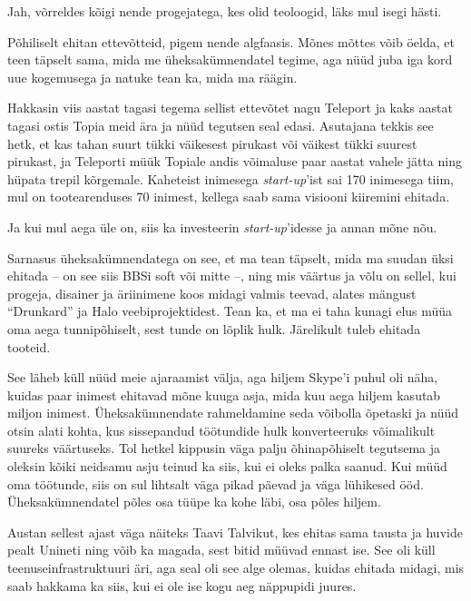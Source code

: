 
Jah, võrreldes kõigi nende progejatega, kes olid teoloogid, läks mul isegi 
hästi.


Põhiliselt ehitan ettevõtteid, pigem nende algfaasis. 
Mõnes mõttes võib öelda, et teen täpselt sama, mida me üheksakümnendatel 
tegime, aga nüüd juba iga kord uue kogemusega ja
natuke tean ka, mida ma räägin. 

Hakkasin viis 
aastat tagasi tegema sellist ettevõtet nagu Teleport ja kaks aastat tagasi ostis Topia
meid ära ja nüüd tegutsen seal edasi. Asutajana tekkis see hetk, et kas tahan suurt tükki 
väikesest pirukast või väikest tükki suurest pirukast, ja Teleporti müük 
Topiale andis võimaluse paar aastat vahele jätta ning hüpata trepil 
kõrgemale. Kaheteist inimesega \emph{start-up}'ist sai 170 inimesega tiim, mul on tootearenduses 70 
inimest, kellega saab sama visiooni kiiremini ehitada. 

Ja kui mul aega üle on, siis ka investeerin \emph{start-up}'idesse ja annan mõne
nõu. 

Sarnasus üheksakümnendatega on see, et ma tean täpselt, mida ma suudan üksi 
ehitada -- on see siis BBSi soft või mitte --, ning mis väärtus ja võlu 
on sellel, kui progeja, disainer ja äriinimene koos midagi valmis teevad, alates mängust \enquote{Drunkard} ja 
Halo veebiprojektidest. Tean ka, et ma ei taha kunagi elus müüa oma aega 
tunnipõhiselt, sest tunde on lõplik hulk. Järelikult tuleb ehitada tooteid. 

See läheb küll nüüd meie ajaraamist välja, aga hiljem 
Skype'i puhul oli näha, kuidas paar inimest ehitavad mõne kuuga asja, 
mida kuu aega hiljem kasutab miljon inimest. Üheksakümnendate 
rahmeldamine seda võibolla õpetaski ja nüüd otsin alati kohta, kus 
sissepandud töötundide hulk konverteeruks võimalikult suureks väärtuseks. Tol 
hetkel kippusin väga palju õhinapõhiselt tegutsema ja 
oleksin kõiki neidsamu asju teinud ka siis, kui ei oleks palka saanud. Kui 
müüd oma töötunde, siis on sul lihtsalt väga pikad päevad ja väga lühikesed 
ööd. Üheksakümnendatel põles osa tüüpe ka kohe läbi, osa põles hiljem. 

Austan sellest ajast väga näiteks
Taavi Talvikut, kes ehitas sama tausta ja huvide 
pealt Unineti ning võib ka magada, sest bitid müüvad 
ennast ise. See oli küll teenuseinfrastruktuuri äri, aga seal oli see alge 
olemas, kuidas ehitada midagi, mis saab hakkama ka siis, kui ei ole ise kogu 
aeg näppupidi juures.